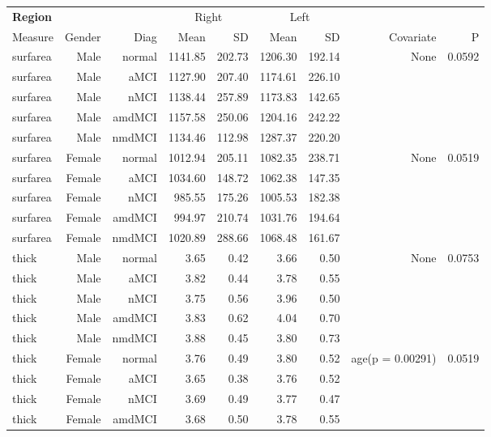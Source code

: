 \documentclass[12pt]{article}
\newcommand\T{\rule{0pt}{2.6ex}}
\newcommand\B{\rule[-1.2ex]{0pt}{0pt}}
\begin{document}
  \newpage
\begin{sidewaystable}
  \centering
  \footnotesize
  \begin{tabular}{l|rr|rr|rr|rr}
  \hline
	\textbf{Region} & & & \multicolumn{2}{c}{Right} \T & \multicolumn{2}{|c}{Left} & & \\
	\multicolumn{1}{l|}{Measure} \T\B & Gender & Diag & Mean & SD & Mean & SD & Covariate & P \\
	\hline\hline
 surfarea & Male & normal & 1141.85 & 202.73 & 1206.30 & 192.14 & None & 0.0592 \\ 
  surfarea & Male & aMCI & 1127.90 & 207.40 & 1174.61 & 226.10 &  &  \\ 
  surfarea & Male & nMCI & 1138.44 & 257.89 & 1173.83 & 142.65 &  &  \\ 
  surfarea & Male & amdMCI & 1157.58 & 250.06 & 1204.16 & 242.22 &  &  \\ 
  surfarea & Male & nmdMCI & 1134.46 & 112.98 & 1287.37 & 220.20 &  &  \\ 
   \hline
surfarea & Female & normal & 1012.94 & 205.11 & 1082.35 & 238.71 & None & 0.0519 \\ 
  surfarea & Female & aMCI & 1034.60 & 148.72 & 1062.38 & 147.35 &  &  \\ 
  surfarea & Female & nMCI & 985.55 & 175.26 & 1005.53 & 182.38 &  &  \\ 
  surfarea & Female & amdMCI & 994.97 & 210.74 & 1031.76 & 194.64 &  &  \\ 
  surfarea & Female & nmdMCI & 1020.89 & 288.66 & 1068.48 & 161.67 &  &  \\ 
   \hline
thick & Male & normal & 3.65 & 0.42 & 3.66 & 0.50 & None & 0.0753 \\ 
  thick & Male & aMCI & 3.82 & 0.44 & 3.78 & 0.55 &  &  \\ 
  thick & Male & nMCI & 3.75 & 0.56 & 3.96 & 0.50 &  &  \\ 
  thick & Male & amdMCI & 3.83 & 0.62 & 4.04 & 0.70 &  &  \\ 
  thick & Male & nmdMCI & 3.88 & 0.45 & 3.80 & 0.73 &  &  \\ 
   \hline
thick & Female & normal & 3.76 & 0.49 & 3.80 & 0.52 & age(p = 0.00291) & 0.0519 \\ 
  thick & Female & aMCI & 3.65 & 0.38 & 3.76 & 0.52 &  &  \\ 
  thick & Female & nMCI & 3.69 & 0.49 & 3.77 & 0.47 &  &  \\ 
  thick & Female & amdMCI & 3.68 & 0.50 & 3.78 & 0.55 &  &  \\ 

\end{tabular}
\end{sidewaystable}
\end{document}
